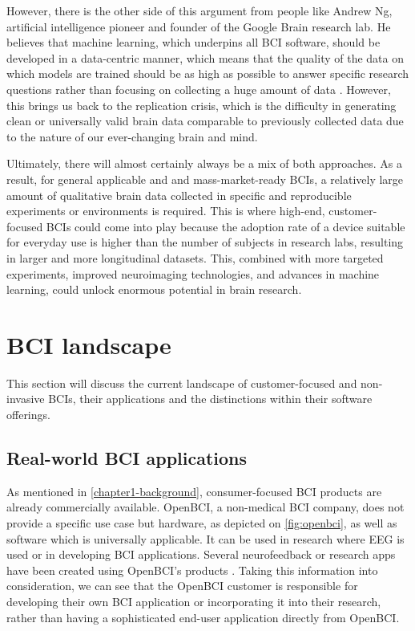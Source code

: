 However, there is the other side of this argument from people like Andrew Ng, artificial intelligence pioneer and founder of the Google Brain research lab. He believes that machine learning, which underpins all BCI software, should be developed in a data-centric manner, which means that the quality of the data on which models are trained should be as high as possible to answer specific research questions rather than focusing on collecting a huge amount of data \citep{brown_why_2022}. However, this brings us back to the replication crisis, which is the difficulty in generating clean or universally valid brain data comparable to previously collected data due to the nature of our ever-changing brain and mind.

Ultimately, there will almost certainly always be a mix of both approaches. As a result, for general applicable and and mass-market-ready BCIs, a relatively large amount of qualitative brain data collected in specific and reproducible experiments or environments is required. This is where high-end, customer-focused BCIs could come into play because the adoption rate of a device suitable for everyday use is higher than the number of subjects in research labs, resulting in larger and more longitudinal datasets. This, combined with more targeted experiments, improved neuroimaging technologies, and advances in machine learning, could unlock enormous potential in brain research.

\section{BCI landscape}
\label{chapter2-research-landscape}

This section will discuss the current landscape of customer-focused and non-invasive BCIs, their applications and the distinctions within their software offerings.

\subsection{Real-world BCI applications}
\label{chapter2-real-world-bci-applications}

As mentioned in \autoref{chapter1-background}, consumer-focused BCI products are already commercially available. OpenBCI, a non-medical BCI company, does not provide a specific use case but hardware, as depicted on \autoref{fig:openbci}, as well as software which is universally applicable. It can be used in research where EEG is used or in developing BCI applications. Several neurofeedback or research apps have been created using OpenBCI's products \citep{openbci_openbci_nodate}. Taking this information into consideration, we can see that the OpenBCI customer is responsible for developing their own BCI application or incorporating it into their research, rather than having a sophisticated end-user application directly from OpenBCI.

